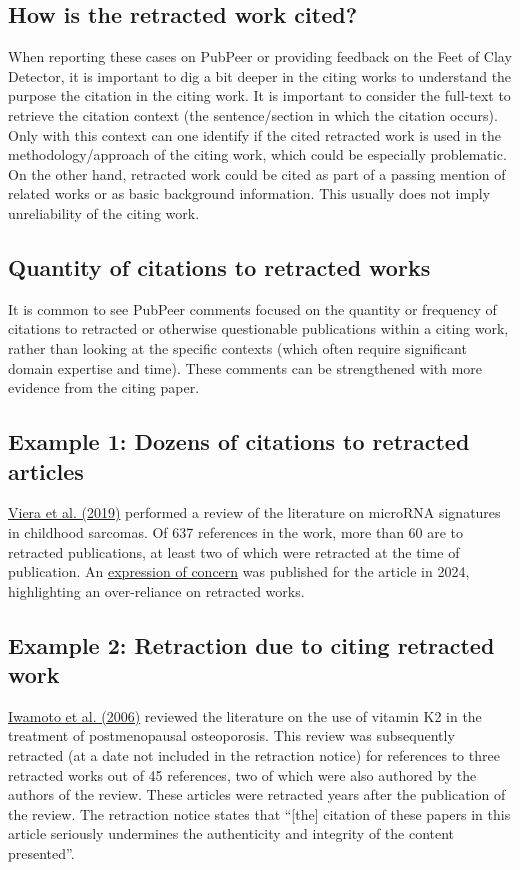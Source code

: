 \documentclass[letterpaper, 12pt]{article}
\begin{document}
\subsection*{How is the retracted work cited?}

When reporting these cases on PubPeer or providing feedback on the Feet of Clay Detector, it is important to dig a bit deeper in the citing works to understand the purpose the citation in the citing work. It is important to consider the full-text to retrieve the citation context (the sentence/section in which the citation occurs). Only with this context can one identify if the cited retracted work is used in the methodology/approach of the citing work, which could be especially problematic. On the other hand, retracted work could be cited as part of a passing mention of related works or as basic background information. This usually does not imply unreliability of the citing work. 

\subsection*{Quantity of citations to retracted works}

It is common to see PubPeer comments focused on the quantity or frequency of citations to retracted or otherwise questionable publications within a citing work, rather than looking at the specific contexts (which often require significant domain expertise and time). These comments can be strengthened with more evidence from the citing paper. 

\subsection*{Example 1: Dozens of citations to retracted articles}
\href{https://doi.org/10.1007/s12094-019-02104-z}{Viera et al. (2019)} performed a review of the literature on microRNA signatures in childhood sarcomas. Of 637 references in the work, more than 60 are to retracted publications, at least two of which were retracted at the time of publication. An \href{https://doi.org/10.1007/s12094-024-03518-0}{expression of concern} was published for the article in 2024, highlighting an over-reliance on retracted works.
\subsection*{Example 2: Retraction due to citing retracted work}
\href{http://dx.doi.org/10.2174/157488606775252629}{Iwamoto et al. (2006)} reviewed the literature on the use of vitamin K2 in the treatment of postmenopausal osteoporosis. This review was subsequently retracted (at a date not included in the retraction notice) for references to three retracted works out of 45 references, two of which were also authored by the authors of the review. These articles were retracted years after the publication of the review. The retraction notice states that ``[the] citation of these papers in this article seriously undermines the authenticity and integrity of the content presented''.
\end{document}
